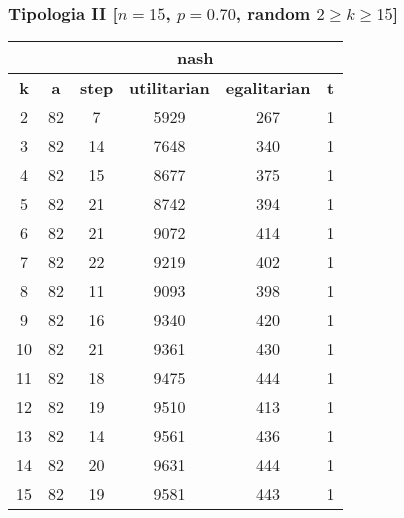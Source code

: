 \documentclass{beamer}
\begin{document}
\begin{frame}
\frametitle{Tipologia II [$n=15$, $p=0.70$, random $2 \geq k \geq 15$]}
\begin{table}[H]
\centering
\scalebox{1} {
\begin{tabular}{|c|c|c|c|c|c|}
\hline
\multicolumn{2}{|c|}{\textbf{}} & \multicolumn{3}{c|}{\textbf{\color{orange}nash}} & \textbf{} \\ \hline
\textbf{\alert{k}} & \textbf{a} & \textbf{step} & \textbf{utilitarian} & \textbf{egalitarian} & \textbf{t} \\ \hline
2 & 82 & 7 & 5929 & 267 & 1 \\ \hline
3 & 82 & 14 & 7648 & 340 & 1 \\ \hline
4 & 82 & 15 & 8677 & 375 & 1 \\ \hline
5 & 82 & 21 & 8742 & 394 & 1 \\ \hline
6 & 82 & 21 & 9072 & 414 & 1 \\ \hline
7 & 82 & 22 & 9219 & 402 & 1 \\ \hline
8 & 82 & 11 & 9093 & 398 & 1 \\ \hline
9 & 82 & 16 & 9340 & 420 & 1 \\ \hline
10 & 82 & 21 & 9361 & 430 & 1 \\ \hline
11 & 82 & 18 & 9475 & 444 & 1 \\ \hline
12 & 82 & 19 & 9510 & 413 & 1 \\ \hline
13 & 82 & 14 & 9561 & 436 & 1 \\ \hline
14 & 82 & 20 & 9631 & 444 & 1 \\ \hline
15 & 82 & 19 & 9581 & 443 & 1 \\ \hline
\end{tabular}
}
\end{table}
\end{frame}
\end{document}
